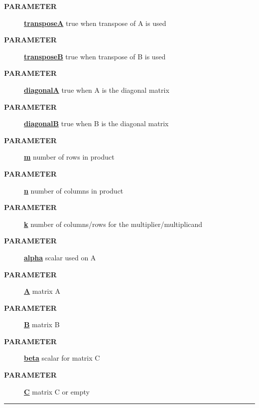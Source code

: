 \par
\begin{description}
\item [\colorbox{tagtype}{\color{white} \textbf{\textsf{PARAMETER}}}] \textbf{\underline{transposeA}} true when transpose of A is used
\item [\colorbox{tagtype}{\color{white} \textbf{\textsf{PARAMETER}}}] \textbf{\underline{transposeB}} true when transpose of B is used
\item [\colorbox{tagtype}{\color{white} \textbf{\textsf{PARAMETER}}}] \textbf{\underline{diagonalA}} true when A is the diagonal matrix
\item [\colorbox{tagtype}{\color{white} \textbf{\textsf{PARAMETER}}}] \textbf{\underline{diagonalB}} true when B is the diagonal matrix
\item [\colorbox{tagtype}{\color{white} \textbf{\textsf{PARAMETER}}}] \textbf{\underline{m}} number of rows in product
\item [\colorbox{tagtype}{\color{white} \textbf{\textsf{PARAMETER}}}] \textbf{\underline{n}} number of columns in product
\item [\colorbox{tagtype}{\color{white} \textbf{\textsf{PARAMETER}}}] \textbf{\underline{k}} number of columns/rows for the multiplier/multiplicand
\item [\colorbox{tagtype}{\color{white} \textbf{\textsf{PARAMETER}}}] \textbf{\underline{alpha}} scalar used on A
\item [\colorbox{tagtype}{\color{white} \textbf{\textsf{PARAMETER}}}] \textbf{\underline{A}} matrix A
\item [\colorbox{tagtype}{\color{white} \textbf{\textsf{PARAMETER}}}] \textbf{\underline{B}} matrix B
\item [\colorbox{tagtype}{\color{white} \textbf{\textsf{PARAMETER}}}] \textbf{\underline{beta}} scalar for matrix C
\item [\colorbox{tagtype}{\color{white} \textbf{\textsf{PARAMETER}}}] \textbf{\underline{C}} matrix C or empty
\end{description}

\rule{\linewidth}{0.5pt}
